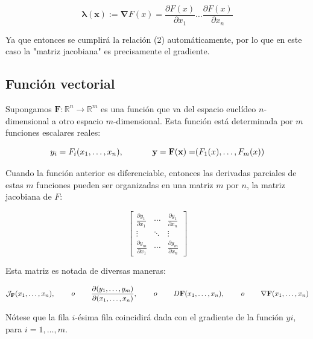 \documentclass[10pt]{article}
\begin{document}
\begin{equation*}
\mathbf{\lambda(x)} := \mathbf{\nabla}F(x) = \frac{\partial F(x)}{\partial x_1} \ldots \frac{\partial F(x)}{\partial x_n}
\end{equation*}

Ya que entonces se cumplirá la relación (2) automáticamente, por lo que en este caso la "matriz jacobiana" es precisamente el gradiente.

\subsection{Función vectorial}

Supongamos $\mathbf{F} \colon \mathbb{R}^n \rightarrow \mathbb{R}^m$ es una función que va del espacio euclídeo $n$-dimensional a otro espacio $m$-dimensional. Esta función está determinada por $m$ funciones escalares reales:

\begin{equation*}
y_i = F_i(x_1, \ldots, x_n), \hspace{1.2cm} \mathbf{y=F(x)=}(F_1(x),\ldots,F_m(x))
\end{equation*}

Cuando la función anterior es diferenciable, entonces las derivadas parciales de estas $m$ funciones pueden ser organizadas en una matriz $m$ por $n$, la matriz jacobiana de $F$:

$$
\begin{bmatrix}
\frac{\partial y_1}{\partial x_1} & \cdots & \frac{\partial y_1}{\partial x_n} \\
\vdots & \ddots & \vdots \\
\frac{\partial y_m}{\partial x_1} & \cdots & \frac{\partial y_m}{\partial x_n}
\end{bmatrix}
$$

Esta matriz es notada de diversas maneras:

$$
\mathcal{J}_\textbf{F}(x_1, \ldots, x_n),\hspace{0.8cm} o \hspace{0.8cm} \frac{\partial(y_1,\ldots, y_m)}{\partial(x_1,\ldots, x_n)},\hspace{0.8cm} o \hspace{0.8cm} D\textbf{F}(x_1, \ldots, x_n),\hspace{0.8cm} o \hspace{0.8cm} \mathbf{\nabla F}(x_1, \ldots, x_n) 
$$

Nótese que la fila $i$-ésima fila coincidirá dada con el gradiente de la función $yi$, para $i=1,\ldots,m$.
\end{document}
